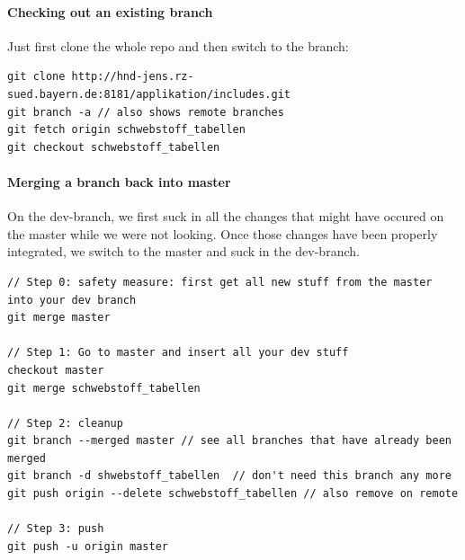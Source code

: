 \paragraph{Checking out an existing branch} Just first clone the whole repo and then switch to the branch: 

\begin{lstlisting}
git clone http://hnd-jens.rz-sued.bayern.de:8181/applikation/includes.git
git branch -a // also shows remote branches
git fetch origin schwebstoff_tabellen
git checkout schwebstoff_tabellen
\end{lstlisting}


\paragraph{Merging a branch back into master} On the dev-branch, we first suck in all the changes that might have occured on the master while we were not looking. Once those changes have been properly integrated, we switch to the master and suck in the dev-branch.

\begin{lstlisting}
// Step 0: safety measure: first get all new stuff from the master into your dev branch
git merge master 

// Step 1: Go to master and insert all your dev stuff 
checkout master
git merge schwebstoff_tabellen

// Step 2: cleanup
git branch --merged master // see all branches that have already been merged
git branch -d shwebstoff_tabellen  // don't need this branch any more
git push origin --delete schwebstoff_tabellen // also remove on remote

// Step 3: push
git push -u origin master
\end{lstlisting}


